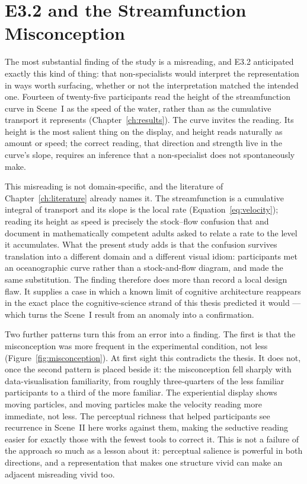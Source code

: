 \section{E3.2 and the Streamfunction Misconception}
\label{sec:disc-e32}

The most substantial finding of the study is a misreading, and E3.2 anticipated exactly this kind of thing: that non-specialists would interpret the representation in ways worth surfacing, whether or not the interpretation matched the intended one. Fourteen of twenty-five participants read the height of the streamfunction curve in Scene~I as the speed of the water, rather than as the cumulative transport it represents (Chapter~\ref{ch:results}). The curve invites the reading. Its height is the most salient thing on the display, and height reads naturally as amount or speed; the correct reading, that direction and strength live in the curve's slope, requires an inference that a non-specialist does not spontaneously make.

This misreading is not domain-specific, and the literature of Chapter~\ref{ch:literature} already names it. The streamfunction is a cumulative integral of transport and its slope is the local rate (Equation~\ref{eq:velocity}); reading its height as speed is precisely the stock--flow confusion that \textcite{sterman2008} and \textcite{cronin2009} document in mathematically competent adults asked to relate a rate to the level it accumulates. What the present study adds is that the confusion survives translation into a different domain and a different visual idiom: participants met an oceanographic curve rather than a stock-and-flow diagram, and made the same substitution. The finding therefore does more than record a local design flaw. It supplies a case in which a known limit of cognitive architecture reappears in the exact place the cognitive-science strand of this thesis predicted it would --- which turns the Scene~I result from an anomaly into a confirmation.

Two further patterns turn this from an error into a finding. The first is that the misconception was more frequent in the experimental condition, not less (Figure~\ref{fig:misconception}). At first sight this contradicts the thesis. It does not, once the second pattern is placed beside it: the misconception fell sharply with data-visualisation familiarity, from roughly three-quarters of the less familiar participants to a third of the more familiar. The experiential display shows moving particles, and moving particles make the velocity reading more immediate, not less. The perceptual richness that helped participants see recurrence in Scene~II here works against them, making the seductive reading easier for exactly those with the fewest tools to correct it. This is not a failure of the approach so much as a lesson about it: perceptual salience is powerful in both directions, and a representation that makes one structure vivid can make an adjacent misreading vivid too.

